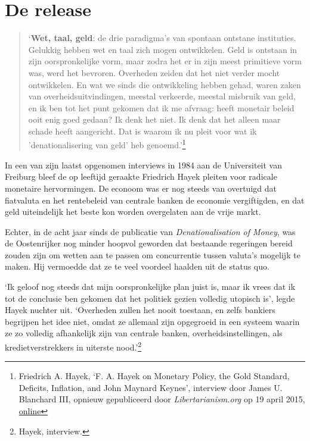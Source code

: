 \documentclass[
  a5paper,
  smalldemyvopaper,11pt,twoside,onecolumn,openright,extrafontsizes]{memoir}
\begin{document}
\chapter{De release}\label{de-release}

\begin{quote}
`\textbf{Wet, taal, geld}: de drie paradigma's van spontaan ontstane
instituties. Gelukkig hebben wet en taal zich mogen ontwikkelen. Geld is
ontstaan in zijn oorspronkelijke vorm, maar zodra het er in zijn meest
primitieve vorm was, werd het bevroren. Overheden zeiden dat het niet
verder mocht ontwikkelen. En wat we sinds die ontwikkeling hebben gehad,
waren zaken van overheidsuitvindingen, meestal verkeerde, meestal
misbruik van geld, en ik ben tot het punt gekomen dat ik me afvraag:
heeft monetair beleid ooit enig goed gedaan? Ik denk het niet. Ik denk
dat het alleen maar schade heeft aangericht. Dat is waarom ik nu pleit
voor wat ik 'denationalisering van geld' heb genoemd.'\footnote{Friedrich
  A. Hayek, `F. A. Hayek on Monetary Policy, the Gold Standard,
  Deficits, Inflation, and John Maynard Keynes', interview door James U.
  Blanchard III, opnieuw gepubliceerd door \emph{Libertarianism.org} op
  19 april 2015,
  \href{https://www.youtube.com/watch?v=EYhEDxFwFRU}{online}}
\end{quote}

In een van zijn laatst opgenomen interviews in 1984 aan de Universiteit
van Freiburg bleef de op leeftijd geraakte Friedrich Hayek pleiten voor
radicale monetaire hervormingen. De econoom was er nog steeds van
overtuigd dat fiatvaluta en het rentebeleid van centrale banken de
economie vergiftigden, en dat geld uiteindelijk het beste kon worden
overgelaten aan de vrije markt.

Echter, in de acht jaar sinds de publicatie van \emph{Denationalisation
of Money}, was de Oostenrijker nog minder hoopvol geworden dat bestaande
regeringen bereid zouden zijn om wetten aan te passen om concurrentie
tussen valuta's mogelijk te maken. Hij vermoedde dat ze te veel voordeel
haalden uit de status quo.

`Ik geloof nog steeds dat mijn oorspronkelijke plan juist is, maar ik
vrees dat ik tot de conclusie ben gekomen dat het politiek gezien
volledig utopisch is', legde Hayek nuchter uit. `Overheden zullen het
nooit toestaan, en zelfs bankiers begrijpen het idee niet, omdat ze
allemaal zijn opgegroeid in een systeem waarin ze zo volledig
afhankelijk zijn van centrale banken, overheidsinstellingen, als
kredietverstrekkers in uiterste nood.'\footnote{Hayek, interview.}
\end{document}
